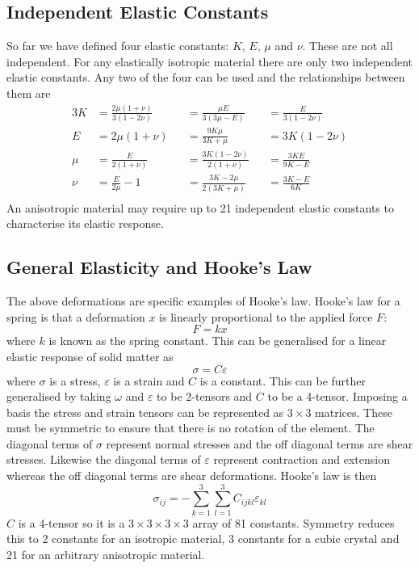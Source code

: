     \subsection{Independent Elastic Constants}
    So far we have defined four elastic constants: \(K\), \(E\), \(\mu\) and \(\nu\).
    These are not all independent.
    For any elastically isotropic material there are only two independent elastic constants.
    Any two of the four can be used and the relationships between them are
    \begin{alignat*}{3}
        K &= \frac{2\mu(1 + \nu)}{3(1 - 2\nu)} &&= \frac{\mu E}{3(3\mu - E)} &&= \frac{E}{3(1 - 2\nu)}\\
        E &=  2\mu(1 + \nu) &&= \frac{9K\mu}{3K + \mu} &&= 3K(1 - 2\nu)\\
        \mu &= \frac{E}{2(1 + \nu)} &&= \frac{3K(1 - 2\nu)}{2(1 + \nu)} &&= \frac{3KE}{9K - E}\\
        \nu &= \frac{E}{2\mu} - 1 &&= \frac{3K - 2\mu}{2(3K + \mu)} &&= \frac{3K - E}{6K}\\
    \end{alignat*}
    An anisotropic material may require up to 21 independent elastic constants to characterise its elastic response.
    
    \subsection{General Elasticity and Hooke's Law}
    The above deformations are specific examples of Hooke's law.
    Hooke's law for a spring is that a deformation \(x\) is linearly proportional to the applied force \(F\):
    \[F = kx\]
    where \(k\) is known as the spring constant.
    This can be generalised for a linear elastic response of solid matter as
    \[\sigma = C\varepsilon\]
    where \(\sigma\) is a stress, \(\varepsilon\) is a strain and \(C\) is a constant.
    This can be further generalised by taking \(\omega\) and \(\varepsilon\) to be 2-tensors and \(C\) to be a 4-tensor.
    Imposing a basis the stress and strain tensors can be represented as \(3\times 3\) matrices.
    These must be symmetric to ensure that there is no rotation of the element.
    The diagonal terms of \(\sigma\) represent normal stresses and the off diagonal terms are shear stresses.
    Likewise the diagonal terms of \(\varepsilon\) represent contraction and extension whereas the off diagonal terms are shear deformations.
    Hooke's law is then
    \[\sigma_{ij} = -\sum_{k = 1}^3\sum_{l = 1}^3 C_{ijkl}\varepsilon_{kl}\]
    \(C\) is a 4-tensor so it is a \(3\times 3\times 3\times 3\) array of 81 constants.
    Symmetry reduces this to 2 constants for an isotropic material, 3 constants for a cubic crystal and 21 for an arbitrary anisotropic material.
    
